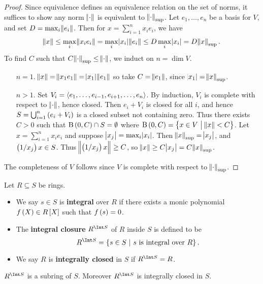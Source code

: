 \begin{proof}
Since equivalence defines an equivalence relation on the set of norms, it suffices to show any norm $ \norm{\cdot} $ is equivalent to $ \norm{\cdot}_{\sup} $. Let $ e_1, \dots, e_n $ be a basis for $ V $, and set $ D = \max_i \norm{e_i} $. Then for $ x = \sum_{i = 1}^n x_ie_i $, we have
$$ \norm{x} \le \max_i \norm{x_ie_i} = \max_i \abs{x_i}\norm{e_i} \le D\max_i \abs{x_i} = D\norm{x}_{\sup}. $$
To find $ C $ such that $ C\norm{\cdot}_{\sup} \le \norm{\cdot} $, we induct on $ n = \dim V $.
\begin{itemize}[leftmargin=0.5in]
\item[$ n = 1 $.] $ \norm{x} = \norm{x_1e_1} = \abs{x_1}\norm{e_1} $ so take $ C = \norm{e_1} $, since $ \abs{x_1} = \norm{x}_{\sup} $.
\item[$ n > 1 $.] Set $ V_i = \left\langle e_1, \dots, e_{i - 1}, e_{i + 1}, \dots, e_n \right\rangle $. By induction, $ V_i $ is complete with respect to $ \norm{\cdot} $, hence closed. Then $ e_i + V_i $ is closed for all $ i $, and hence $ S = \bigcup_{i = 1}^n \br{e_i + V_i} $ is a closed subset not containing zero. Thus there exists $ C > 0 $ such that $ \B\br{0, C} \cap S = \emptyset $ where $ \B\br{0, C} = \cbr{x \in V \st \norm{x} < C} $. Let $ x = \sum_{i = 1}^n x_ie_i $ and suppose $ \abs{x_j} = \max_i \abs{x_i} $. Then $ \norm{x}_{\sup} = \abs{x_j} $, and $ \br{1 / x_j}x \in S $. Thus $ \norm{\br{1 / x_j}x} \ge C $, so $ \norm{x} \ge C\abs{x_j} = C\norm{x}_{\sup} $.
\end{itemize}
The completeness of $ V $ follows since $ V $ is complete with respect to $ \norm{\cdot}_{\sup} $.
\end{proof}

\begin{definition}
Let $ R \subseteq S $ be rings.
\begin{itemize}
\item We say $ s \in S $ is \textbf{integral} over $ R $ if there exists a monic polynomial $ f\br{X} \in R\sbr{X} $ such that $ f\br{s} = 0 $.
\item The \textbf{integral closure} $ R^{\Int S} $ of $ R $ inside $ S $ is defined to be
$$ R^{\Int S} = \cbr{s \in S \st s \ \text{is integral over} \ R}. $$
\item We say $ R $ is \textbf{integrally closed} in $ S $ if $ R^{\Int S} = R $.
\end{itemize}
\end{definition}

\begin{proposition}
$ R^{\Int S} $ is a subring of $ S $. Moreover $ R^{\Int S} $ is integrally closed in $ S $.
\end{proposition}

